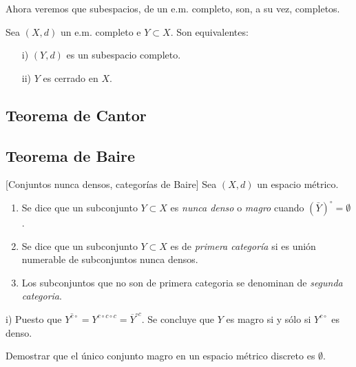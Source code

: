 Ahora veremos que subespacios, de un e.m. completo, son, a su vez,
completos.

\begin{proposicion}{} Sea $(X,d)$ un e.m. completo e $Y\subset X$.
Son equivalentes:
\begin{itemize}
\item[i)] $(Y,d)$ es un subespacio completo.
\item[ii)] $Y$ es cerrado en $X$.
\end{itemize}
\end{proposicion}

\subsection{Teorema de Cantor}
\subsection{Teorema de Baire}
\begin{definicion}{}[Conjuntos nunca densos, categorías de Baire] Sea $(X, d)$ un espacio métrico. 
\begin{enumerate}
 \item Se dice que un subconjunto $Y \subset X$ es \emph{nunca denso} o \emph{magro} cuando $(\bar{Y})^{\circ}=\emptyset$.
 \item Se dice que un subconjunto $Y \subset X$ es de \emph{ primera categoría}  si es  unión numerable de subconjuntos nunca densos.
 \item Los subconjuntos que no son de primera categoria se denominan de \emph{segunda categoria}.
\end{enumerate}
 
 

\end{definicion}

\begin{observa}{} i) Puesto que  $\overline{Y^{c\circ}}=
 Y^{c\circ c\circ c}=\overline{Y}^{\circ c}$. Se concluye que  $Y$ es magro si y sólo si $Y^{c\circ}$ es denso.
 \\
\end{observa}

\begin{ejercicio}{} Demostrar que el único conjunto magro en un espacio métrico discreto es $\emptyset$. 
 \end{ejercicio}

